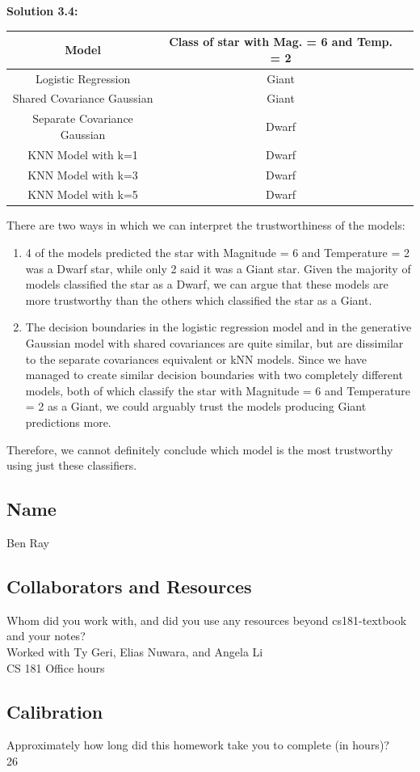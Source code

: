 \documentclass[submit]{harvardml}
\begin{document}
\noindent\textbf{Solution 3.4:}\\
\begin{center}
\begin{tabular}{ |c|c|c| } 
 \hline
 Model & Class of star with Mag. = 6 and Temp. = 2 \\ 
 \hline\hline
 Logistic Regression & Giant \\
 \hline
 Shared Covariance Gaussian & Giant \\ 
 \hline
 Separate Covariance Gaussian & Dwarf\\
 \hline
 KNN Model with k=1 & Dwarf\\
 \hline
 KNN Model with k=3 & Dwarf\\
 \hline
 KNN Model with k=5 & Dwarf\\
 \hline
\end{tabular}
\end{center}

There are two ways in which we can interpret the trustworthiness of the models:
\begin{enumerate}
    \item 4 of the models predicted the star with Magnitude = 6 and Temperature = 2 was a Dwarf star, while only 2 said it was a Giant star. Given the majority of models classified the star as a Dwarf, we can argue that these models are more trustworthy than the others which classified the star as a Giant.
    \item The decision boundaries in the logistic regression model and in the generative Gaussian model with shared covariances are quite similar, but are dissimilar to the separate covariances equivalent or kNN models. Since we have managed to create similar decision boundaries with two completely different models, both of which classify the star with Magnitude = 6 and Temperature = 2 as a Giant, we could arguably trust the models producing Giant predictions more.
\end{enumerate}
Therefore, we cannot definitely conclude which model is the most trustworthy using just these classifiers.

\newpage
\subsection*{Name}
Ben Ray

\subsection*{Collaborators and Resources}
Whom did you work with, and did you use any resources beyond cs181-textbook and your notes?\\
Worked with Ty Geri, Elias Nuwara, and Angela Li\\
CS 181 Office hours

\subsection*{Calibration}
Approximately how long did this homework take you to complete (in hours)?\\
26
\end{document}
